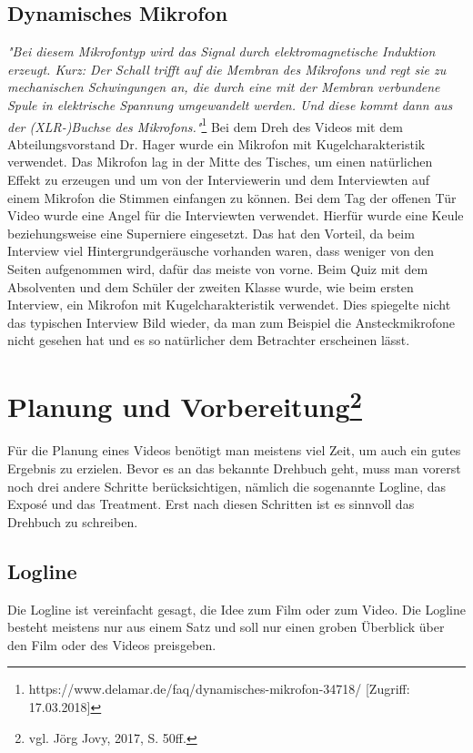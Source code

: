 \subsection{Dynamisches Mikrofon}
\textit{"Bei diesem Mikrofontyp wird das Signal durch elektromagnetische Induktion erzeugt. Kurz: Der Schall trifft auf die Membran des Mikrofons und regt sie zu mechanischen Schwingungen an, die durch eine mit der Membran verbundene Spule in elektrische Spannung umgewandelt werden. Und diese kommt dann aus der (XLR-)Buchse des Mikrofons."}\footnote{\label{}https://www.delamar.de/faq/dynamisches-mikrofon-34718/ [Zugriff: 17.03.2018]}
Bei dem Dreh des Videos mit dem Abteilungsvorstand Dr. Hager wurde ein Mikrofon mit Kugelcharakteristik verwendet. Das Mikrofon lag in der Mitte des Tisches, um einen natürlichen Effekt zu erzeugen und um von der Interviewerin und dem Interviewten auf einem Mikrofon die Stimmen einfangen zu können.
Bei dem Tag der offenen Tür Video wurde eine Angel für die Interviewten verwendet. Hierfür wurde eine Keule beziehungsweise eine Superniere eingesetzt. Das hat den Vorteil, da beim Interview viel Hintergrundgeräusche vorhanden waren, dass weniger von den Seiten aufgenommen wird, dafür das meiste von vorne.
Beim Quiz mit dem Absolventen und dem Schüler der zweiten Klasse wurde, wie beim ersten Interview, ein Mikrofon mit Kugelcharakteristik verwendet. Dies spiegelte nicht das typischen Interview Bild wieder, da man zum Beispiel die Ansteckmikrofone nicht gesehen hat und es so natürlicher dem Betrachter erscheinen lässt.
\section[Planung und Vorbereitung]{Planung und Vorbereitung\protect\footnote{\label{}vgl. Jörg Jovy, 2017, S. 50ff.}}
Für die Planung eines Videos benötigt man meistens viel Zeit, um auch ein gutes Ergebnis zu erzielen. Bevor es an das bekannte Drehbuch geht, muss man vorerst noch drei andere Schritte berücksichtigen, nämlich die sogenannte Logline, das Expos\'{e} und das Treatment. Erst nach diesen Schritten ist es sinnvoll das Drehbuch zu schreiben. 
\subsection{Logline}
Die Logline ist vereinfacht gesagt, die Idee zum Film oder zum Video. Die Logline besteht meistens nur aus einem Satz und soll nur einen groben Überblick über den Film oder des Videos preisgeben. 
